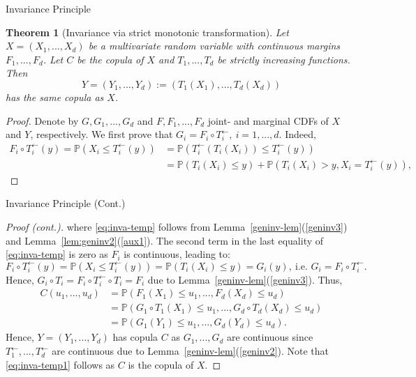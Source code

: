 \documentclass[envcountsect]{beamer}
\newcommand{\bP}{\mathbb{P}}
\theoremstyle{definition}
\theoremstyle{plain}
\newtheorem{thm}[df]{Theorem}
\newcommand*{\geninv}[1]{#1^{\leftarrow}}
\begin{document}
\begin{frame}{Invariance Principle}
	\begin{thm}[Invariance via strict monotonic transformation]
		Let $X=(X_1,...,X_d)$ be a multivariate random variable with continuous margins $F_1,..., F_d$. Let $C$ be the copula of $X$ and $T_1,..., T_d$ be strictly increasing functions.  Then 
		\[Y = (Y_1, ..., Y_d) := (T_1(X_1), ..., T_d(X_d))\]
		has the same copula as $X$.
	\end{thm}
\begin{proof}
	Denote by $G, G_1,..., G_d$ and $F, F_1, ...,F_d$ joint- and marginal CDFs of $X$ and $Y$, respectively. We first prove that
	$G_i = F_i \circ \geninv{T_i}, \ i = 1,...,d.$
	Indeed, 
	\begin{align}
		\label{eq:inva-temp} \nonumber
		F_i \circ \geninv{T_i}(y) = \bP(X_i \le \geninv{T_i}(y)) &=  \bP(\geninv{T_i}(T_i(X_i))\le \geninv{T_i}(y))\\ 
		& = \bP(T_i(X_i) \le y) + \bP(T_i(X_i) > y, X_i = \geninv{T_i}(y)),
	\end{align} 

\end{proof}
\end{frame}
\begin{frame}{Invariance Principle (Cont.)}
	\begin{proof}[Proof (cont.)]
		where \eqref{eq:inva-temp} follows from Lemma~\ref{geninv-lem}(\ref{geninv3}) and Lemma~\ref{lem:geninv2}(\ref{aux1}). The second term in the last equality of \eqref{eq:inva-temp} is zero as $F_i$ is continuous, leading to:
		\begin{equation*}
			F_i \circ \geninv{T_i}(y) = \bP(X_i \le \geninv{T_i}(y)) = \bP(T_i(X_i) \le y) = G_i(y),\ \text{i.e. } G_i = F_i \circ \geninv{T_i}.
		\end{equation*}
		Hence, $G_i\circ T_i = F_i \circ \geninv{T_i} \circ T_i = F_i$ due to Lemma~\ref{geninv-lem}(\ref{geninv3}). 
		Thus,
		\begin{align}
			\label{eq:inva-temp1}
			C(u_1,..., u_d) & = \bP(F_1(X_1) \le u_1,..., F_d(X_d) \le u_d )\\ 
			& = \bP(G_1\circ T_1(X_1) \le u_1,..., G_d\circ T_d(X_d) \le u_d )\\
			& = \bP(G_1(Y_1) \le u_1,..., G_d(Y_d) \le u_d).
		\end{align}
	Hence, $Y=(Y_1,...,Y_d)$ has copula $C$ as $G_1,...,G_d$ are continuous since $\geninv{T_1},...,\geninv{T_d}$ are continuous due to Lemma~\ref{geninv-lem}(\ref{geninv2}). Note that \eqref{eq:inva-temp1} follows as $C$ is the copula of $X$.
	\end{proof}
\end{frame}
\end{document}
